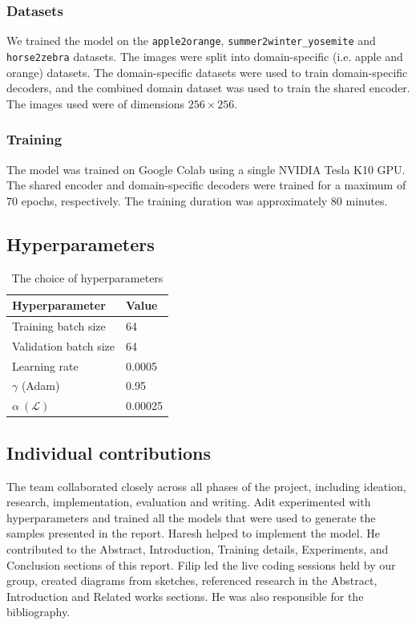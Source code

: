 \documentclass{article}
\begin{document}
\subsubsection{Datasets}
We trained the model on the \texttt{apple2orange}, \texttt{summer2winter\_yosemite} and \texttt{horse2zebra} datasets. The images were split into domain-specific (i.e. apple and orange) datasets. The domain-specific datasets were used to train domain-specific decoders, and the combined domain dataset was used to train the shared encoder. The images used were of dimensions $256\times256$.
\subsubsection{Training}
The model was trained on Google Colab using a single NVIDIA Tesla K10 GPU. The shared encoder and domain-specific decoders were trained for a maximum of 70 epochs, respectively. The training duration was approximately 80 minutes.
\subsection{Hyperparameters}
\begin{table}[H]
  \caption{The choice of hyperparameters}
  \label{sample-table}
  \centering
  \begin{tabular}{ll}
    \toprule
    Hyperparameter     & Value\\
    \midrule
    Training batch size & 64\\
    Validation batch size & 64\\
    Learning rate & 0.0005\\
    $\gamma$ (Adam) & 0.95\\
    $\alpha\ (\mathcal{L})$ & 0.00025\\
    \bottomrule
  \end{tabular}
  \label{tab:hyperparams}
\end{table}
\subsection{Individual contributions}
The team collaborated closely across all phases of the project, including ideation, research, implementation, evaluation and writing. Adit experimented with hyperparameters and trained all the models that were used to generate the samples presented in the report. Haresh helped to implement the model. He contributed to the Abstract, Introduction, Training details, Experiments, and Conclusion sections of this report. Filip led the live coding sessions held by our group, created diagrams from sketches, referenced research in the Abstract, Introduction and Related works sections. He was also responsible for the bibliography.
\end{document}
